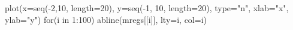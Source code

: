 \begin{Schunk}
\begin{Sinput}
 plot(x=seq(-2,10, length=20), y=seq(-1, 10, length=20), type="n", xlab="x", ylab="y")
 for(i in 1:100){
  abline(mregs[[i]], lty=i, col=i)
  }
\end{Sinput}
\end{Schunk}
